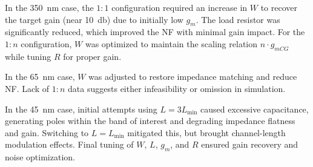 In the \SI{350}{\nano\meter} case, the $1{:}1$ configuration required an increase in $W$ to recover the target gain (near \SI{10}{\decibel}) due to initially low $g_m$. The load resistor was significantly reduced, which improved the NF with minimal gain impact. For the $1{:}n$ configuration, $W$ was optimized to maintain the scaling relation $n \cdot g_{mCG}$ while tuning $R$ for proper gain.

In the \SI{65}{\nano\meter} case, $W$ was adjusted to restore impedance matching and reduce NF. Lack of $1{:}n$ data suggests either infeasibility or omission in simulation.

In the \SI{45}{\nano\meter} case, initial attempts using $L = 3L_{\min}$ caused excessive capacitance, generating poles within the band of interest and degrading impedance flatness and gain. Switching to $L = L_{\min}$ mitigated this, but brought channel-length modulation effects. Final tuning of $W$, $L$, $g_m$, and $R$ ensured gain recovery and noise optimization.